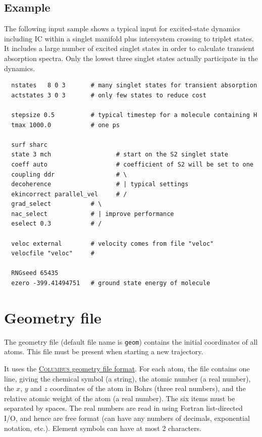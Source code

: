 \documentclass[a4paper,11pt,DIV=15,openany,twoside=false]{scrbook}
\newcommand{\ttt}[1]{\texttt{#1}}
\newenvironment{example}{
  \vspace{0mm}
  \definecolor{shadecolor}{HTML}{BBDDFF}
  \begin{shaded}
  \begin{minipage}{0.9\textwidth}
}{
  \end{minipage}
  \end{shaded}
}
\begin{document}
\subsection{Example}

The following input sample shows a typical input for excited-state dynamics including IC within a singlet manifold plus intersystem crossing to triplet states. It includes a large number of excited singlet states in order to calculate transient absorption spectra. Only the lowest three singlet states actually participate in the dynamics. 

\begin{example}
  \begin{verbatim}
  nstates   8 0 3       # many singlet states for transient absorption
  actstates 3 0 3       # only few states to reduce cost

  stepsize 0.5          # typical timestep for a molecule containing H
  tmax 1000.0           # one ps

  surf sharc
  state 3 mch                  # start on the S2 singlet state
  coeff auto                   # coefficient of S2 will be set to one
  coupling ddr                 # \
  decoherence                  # | typical settings
  ekincorrect parallel_vel     # /
  grad_select           # \
  nac_select            # | improve performance
  eselect 0.3           # /

  veloc external        # velocity comes from file "veloc"
  velocfile "veloc"     #

  RNGseed 65435
  ezero -399.41494751   # ground state energy of molecule
  \end{verbatim}
\end{example}



\section{Geometry file}\label{sec:geomfile}

The geometry file (default file name is \ttt{geom}) contains the initial coordinates of all atoms. This file must be present when starting a new trajectory.

It uses the \href{http://www.univie.ac.at/columbus/docs_COL70/documentation_main.html}{\textsc{Columbus} geometry file format}. For each atom, the file contains one line, giving the chemical symbol (a string), the atomic number (a real number), the $x$, $y$ and $z$ coordinates of the atom in Bohrs (three real numbers), and the relative atomic weight of the atom (a real number). The six items must be separated by spaces. The real numbers are read in using Fortran list-directed I/O, and hence are free format (can have any numbers of decimals, exponential notation, etc.). Element symbols can have at most 2 characters.
\end{document}
